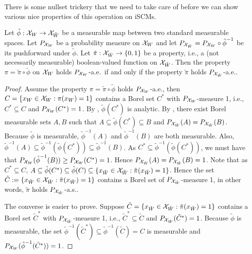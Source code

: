 There is some nullset trickery that we need to take care of before we can show various nice properties of this operation on iSCMs.
\begin{Lem}\label{lem:pushforward_as}
  Let ${\tilde\phi} : \mathcal{X}_W \to \mathcal{X}_{\tilde W}$ be a measurable map between two standard measurable spaces. 
  Let $P_{\mathcal{X}_W}$ be a probability measure on $\mathcal{X}_W$ and let $P_{\mathcal{X}_{\tilde W}} = P_{\mathcal{X}_W} \circ {\tilde\phi}^{-1}$ be its pushforward under ${\tilde\phi}$. 
  Let $\tilde \pi:\mathcal{X}_{\tilde W}\to\{0,1\}$ be a property, i.e., a (not necessarily measurable) boolean-valued function on $\mathcal{X}_{\tilde W}$. 
  Then the property $\pi = \tilde \pi\circ{\tilde\phi}$ on $\mathcal{X}_W$ holds $P_{\mathcal{X}_W}$-a.e.\ if and only if the property $\tilde \pi$ holds $P_{\mathcal{X}_{\tilde W}}$-a.e..
\end{Lem}
\begin{proof}
  Assume the property $\pi = \tilde \pi\circ{\tilde\phi}$ holds $P_{\mathcal{X}_W}$-a.e., then $C=\{x_W\in\mathcal{X}_W : \pi(x_W)=1\}$ contains a Borel set $C^*$ with $P_{\mathcal{X}_W}$-measure 1, i.e., $C^* \subseteq C$ and $P_{\mathcal{X}_W}(C^*) = 1$.
  By \cite[Proposition~8.2.6]{Cohn2013}, ${\tilde\phi}(C^*)$ is analytic. 
  By \cite[Theorem~8.4.1]{Cohn2013}, there exist Borel measurable sets $A, B$ such that $A \subseteq {\tilde\phi}(C^*) \subseteq B$ and $P_{\mathcal{X}_{\tilde W}}(A) = P_{\mathcal{X}_{\tilde W}}(B)$. 
  Because ${\tilde\phi}$ is measurable, ${\tilde\phi}^{-1}(A)$ and ${\tilde\phi}^{-1}(B)$ are both measurable. 
  Also, ${\tilde\phi}^{-1}(A) \subseteq {\tilde\phi}^{-1}({\tilde\phi}(C^*)) \subseteq {\tilde\phi}^{-1}(B)$. 
  As $C^* \subseteq {\tilde\phi}^{-1}({\tilde\phi}(C^*))$, we must have that $P_{\mathcal{X}_W}({\tilde\phi}^{-1}(B)) \ge P_{\mathcal{X}_W}(C^*) = 1$. 
  Hence $P_{\mathcal{X}_{\tilde W}}(A) = P_{\mathcal{X}_{\tilde W}}(B) = 1$. 
  Note that as $C^* \subseteq C$, $A \subseteq {\tilde\phi}(C^*) \subseteq {\tilde\phi}(C)\subseteq\{x_{\tilde{W}}\in\mathcal{X}_{\tilde W} : \tilde \pi(x_{\tilde{W}}) = 1\}$. 
  Hence the set $\tilde{C} := \{x_{\tilde{W}}\in\mathcal{X}_{\tilde W} : \tilde \pi(x_{\tilde{W}}) = 1\}$ contains a Borel set of $P_{\mathcal{X}_{\tilde W}}$-measure 1, in other words, $\tilde \pi$ holds $P_{\mathcal{X}_{\tilde W}}$-a.s..

  The converse is easier to prove. 
  Suppose $\tilde{C}=\{x_{\tilde{W}}\in\mathcal{X}_{\tilde W} : \tilde \pi(x_{\tilde{W}})=1\}$ contains a Borel set $\tilde{C}^*$ with $P_{\mathcal{X}_{\tilde W}}$-measure 1, i.e., $\tilde{C}^* \subseteq \tilde{C}$ and $P_{\mathcal{X}_{\tilde W}}(\tilde{C}^*) = 1$. 
  Because ${\tilde\phi}$ is measurable, the set ${\tilde\phi}^{-1}(\tilde{C}^*) \subseteq {\tilde\phi}^{-1}(\tilde{C})=C$ is measurable and $P_{\mathcal{X}_W}({\tilde\phi}^{-1}(\tilde{C}^*)) = 1$. 
\end{proof}
